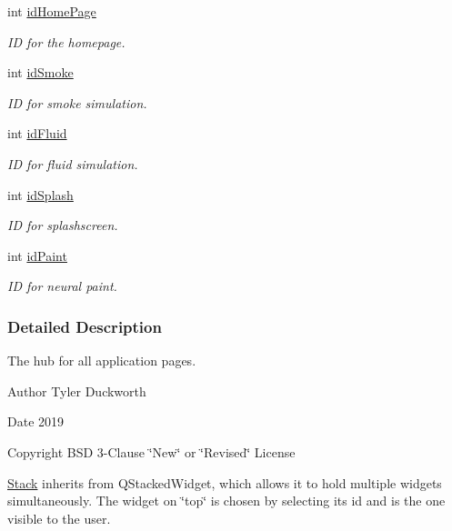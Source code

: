 \begin{DoxyCompactItemize}
int \mbox{\hyperlink{classStack_a11bccc127cb975dc118f08df920fd48d}{id\+Home\+Page}}
\begin{DoxyCompactList}\small\item\em ID for the homepage. \end{DoxyCompactList}\item 
int \mbox{\hyperlink{classStack_ad4c5c03c0dde0b63650bd258183a6ed3}{id\+Smoke}}
\begin{DoxyCompactList}\small\item\em ID for smoke simulation. \end{DoxyCompactList}\item 
int \mbox{\hyperlink{classStack_a91b33262d86feccc9a358076b69a0e90}{id\+Fluid}}
\begin{DoxyCompactList}\small\item\em ID for fluid simulation. \end{DoxyCompactList}\item 
int \mbox{\hyperlink{classStack_a448b69ac9652860c3f94f4cf2972052f}{id\+Splash}}
\begin{DoxyCompactList}\small\item\em ID for splashscreen. \end{DoxyCompactList}\item 
int \mbox{\hyperlink{classStack_af1ad238355f4a635bda88ca8b664dd29}{id\+Paint}}
\begin{DoxyCompactList}\small\item\em ID for neural paint. \end{DoxyCompactList}\end{DoxyCompactItemize}


\subsubsection{Detailed Description}
The hub for all application pages. 

\begin{DoxyAuthor}{Author}
Tyler Duckworth 
\end{DoxyAuthor}
\begin{DoxyDate}{Date}
2019 
\end{DoxyDate}
\begin{DoxyCopyright}{Copyright}
B\+SD 3-\/Clause \char`\"{}\+New\char`\"{} or \char`\"{}\+Revised\char`\"{} License
\end{DoxyCopyright}
\mbox{\hyperlink{classStack}{Stack}} inherits from Q\+Stacked\+Widget, which allows it to hold multiple widgets simultaneously. The widget on \char`\"{}top\char`\"{} is chosen by selecting its id and is the one visible to the user. 

